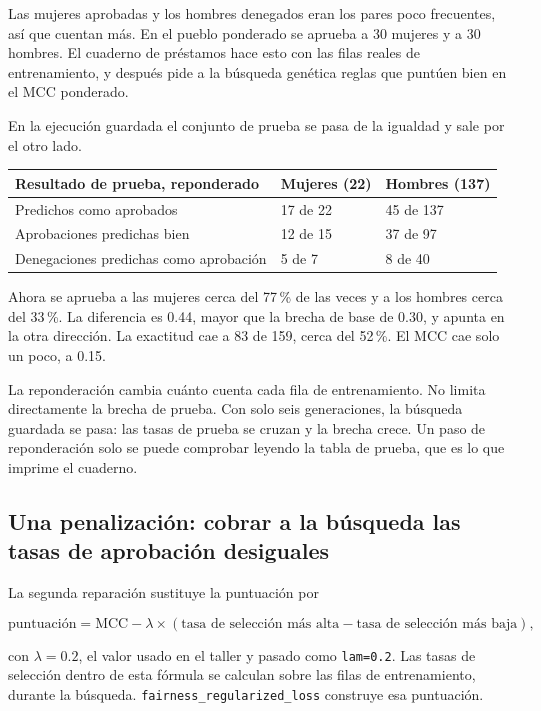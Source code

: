 \documentclass[11pt]{article}
\newcommand{\fn}[1]{\texttt{\small #1}}
\newcommand{\pct}[1]{\mbox{#1\,\%}}
\begin{document}
\noindent
Las mujeres aprobadas y los hombres denegados eran los pares poco frecuentes, así que cuentan más. En el pueblo ponderado se aprueba a 30 mujeres y a 30 hombres. El cuaderno de préstamos hace esto con las filas reales de entrenamiento, y después pide a la búsqueda genética reglas que puntúen bien en el MCC ponderado.

En la ejecución guardada el conjunto de prueba se pasa de la igualdad y sale por el otro lado.

\begin{table}[H]
\centering
\small
\begin{tabularx}{\textwidth}{@{}l Y Y@{}}
\toprule
Resultado de prueba, reponderado & Mujeres (22) & Hombres (137) \\
\midrule
Predichos como aprobados & 17 de 22 & 45 de 137 \\
Aprobaciones predichas bien & 12 de 15 & 37 de 97 \\
Denegaciones predichas como aprobación & 5 de 7 & 8 de 40 \\
\bottomrule
\end{tabularx}
\end{table}

Ahora se aprueba a las mujeres cerca del \pct{77} de las veces y a los hombres cerca del \pct{33}. La diferencia es 0.44, mayor que la brecha de base de 0.30, y apunta en la otra dirección. La exactitud cae a 83 de 159, cerca del \pct{52}. El MCC cae solo un poco, a 0.15.

\begin{idea}
La reponderación cambia cuánto cuenta cada fila de entrenamiento. No limita directamente la brecha de prueba. Con solo seis generaciones, la búsqueda guardada se pasa: las tasas de prueba se cruzan y la brecha crece. Un paso de reponderación solo se puede comprobar leyendo la tabla de prueba, que es lo que imprime el cuaderno.
\end{idea}

\subsection{Una penalización: cobrar a la búsqueda las tasas de aprobación desiguales}

La segunda reparación sustituye la puntuación por

\[
\text{puntuación}
=
\mathrm{MCC}
-
\lambda
\times
(\text{tasa de selección más alta} - \text{tasa de selección más baja}),
\]

con \(\lambda = 0.2\), el valor usado en el taller y pasado como \fn{lam=0.2}. Las tasas de selección dentro de esta fórmula se calculan sobre las filas de entrenamiento, durante la búsqueda. \fn{fairness\_regularized\_loss} construye esa puntuación.
\end{document}
